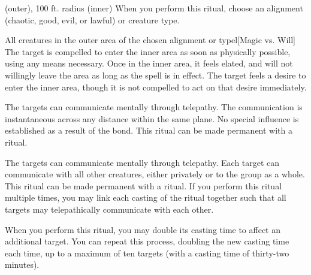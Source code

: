 \spellrng{\rngclose}
 (outer), 100 ft. radius (inner)
\spellspecial When you perform this ritual, choose an alignment (chaotic, good, evil, or lawful) or creature type.
\begin{spelltargets}{All creatures in the outer area of the chosen alignment or type}l[Magic vs. Will]
    \spellsuccess The target is compelled to enter the inner area as soon as physically possible, using any means necessary. Once in the inner area, it feels elated, and will not willingly leave the area as long as the spell is in effect.
    \spellfailure The target feels a desire to enter the inner area, though it is not compelled to act on that desire immediately.
\end{spelltargets}

\spellrng{\rngclose}
\spelldur{\durext \dismissable}
\spellline
\spelleffect The targets can communicate mentally through telepathy. The communication is instantaneous across any distance within the same plane.
\spellnotes No special influence is established as a result of the bond. This ritual can be made permanent with a  ritual.

\spelldur{\durext \dismissable}
\spellline
\spelleffect The targets can communicate mentally through telepathy. Each target can communicate with all other creatures, either privately or to the group as a whole.
\spellnotes This ritual can be made permanent with a  ritual. If you perform this ritual multiple times, you may link each casting of the ritual together such that all targets may telepathically communicate with each other. 

\spellspecial When you perform this ritual, you may double its casting time to affect an additional target. You can repeat this process, doubling the new casting time each time, up to a maximum of ten targets (with a casting time of thirty-two minutes).

